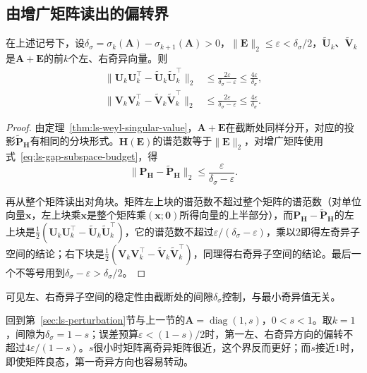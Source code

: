 \subsection{由增广矩阵读出的偏转界}
\begin{theorem}[奇异子空间的谱隙界]
\label{thm:ls-singular-subspace-gap}
在上述记号下，设$\delta_\sigma=\sigma_k(\bm A)-\sigma_{k+1}(\bm A)>0$，$\lVert\bm E\rVert_2\leq\varepsilon<\delta_\sigma/2$，$\widetilde{\bm U}_k$、$\widetilde{\bm V}_k$是$\bm A+\bm E$的前$k$个左、右奇异向量。则
\begin{equation}
 \begin{aligned}
 \lVert\bm U_k\bm U_k^\top-\widetilde{\bm U}_k\widetilde{\bm U}_k^\top\rVert_2&\leq\frac{2\varepsilon}{\delta_\sigma-\varepsilon}\leq\frac{4\varepsilon}{\delta_\sigma},\\
 \lVert\bm V_k\bm V_k^\top-\widetilde{\bm V}_k\widetilde{\bm V}_k^\top\rVert_2&\leq\frac{2\varepsilon}{\delta_\sigma-\varepsilon}\leq\frac{4\varepsilon}{\delta_\sigma}.
 \end{aligned}
 \label{eq:ls-singular-subspace-gap}
\end{equation}
\end{theorem}
\begin{proof}
由定理~\ref{thm:ls-weyl-singular-value}，$\bm A+\bm E$在截断处同样分开，对应的投影$\widetilde{\bm P}_{\bm H}$有相同的分块形式。$\bm H(\bm E)$的谱范数等于$\lVert\bm E\rVert_2$，对增广矩阵使用式~\eqref{eq:ls-gap-subspace-budget}，得
\[
 \lVert\bm P_{\bm H}-\widetilde{\bm P}_{\bm H}\rVert_2\leq\frac{\varepsilon}{\delta_\sigma-\varepsilon}.
\]

再从整个矩阵读出对角块。矩阵左上块的谱范数不超过整个矩阵的谱范数（对单位向量$\bm x$，左上块乘$\bm x$是整个矩阵乘$(\bm x;\bm0)$所得向量的上半部分），而$\bm P_{\bm H}-\widetilde{\bm P}_{\bm H}$的左上块是$\tfrac12(\bm U_k\bm U_k^\top-\widetilde{\bm U}_k\widetilde{\bm U}_k^\top)$，它的谱范数不超过$\varepsilon/(\delta_\sigma-\varepsilon)$，乘以$2$即得左奇异子空间的结论；右下块是$\tfrac12(\bm V_k\bm V_k^\top-\widetilde{\bm V}_k\widetilde{\bm V}_k^\top)$，同理得右奇异子空间的结论。最后一个不等号用到$\delta_\sigma-\varepsilon>\delta_\sigma/2$。
\end{proof}

可见左、右奇异子空间的稳定性由截断处的间隙$\delta_\sigma$控制，与最小奇异值无关。

回到第~\ref{sec:ls-perturbation}节与上一节的$\bm A=\operatorname{diag}(1,s)$，$0<s<1$。取$k=1$，间隙为$\delta_\sigma=1-s$；误差预算$\varepsilon<(1-s)/2$时，第一左、右奇异方向的偏转不超过$4\varepsilon/(1-s)$。$s$很小时矩阵离奇异矩阵很近，这个界反而更好；而$s$接近$1$时，即使矩阵良态，第一奇异方向也容易转动。

